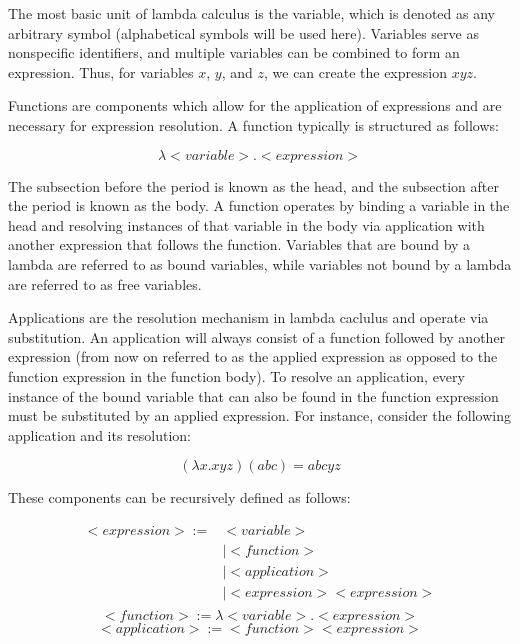 \documentclass[letterpaper, 10 pt, conference]{ieeeconf}  %
\begin{document}
The most basic unit of lambda calculus is the variable, which is denoted as any arbitrary symbol (alphabetical symbols will be used here). Variables serve as nonspecific identifiers, and multiple variables can be combined to form an expression. Thus, for variables $x$, $y$, and $z$, we can create the expression $xyz$.

Functions are components which allow for the application of expressions and are necessary for expression resolution. A function typically is structured as follows:

\begin{equation}
    \lambda <variable> . <expression>
\end{equation}

The subsection before the period is known as the head, and the subsection after the period is known as the body. A function operates by binding a variable in the head and resolving instances of that variable in the body via application with another expression that follows the function. Variables that are bound by a lambda are referred to as bound variables, while variables not bound by a lambda are referred to as free variables.

Applications are the resolution mechanism in lambda caclulus and operate via substitution. An application will always consist of a function followed by another expression (from now on referred to as the applied expression as opposed to the function expression in the function body). To resolve an application, every instance of the bound variable that can also be found in the function expression must be substituted by an applied expression. For instance, consider the following application and its resolution:

\begin{equation}
    (\lambda x . xyz) (abc) = abcyz
\end{equation}

These components can be recursively defined \cite{Rojas} as follows:

\begin{equation}
    \begin{split}
    <expression> := &<variable>\\
                    &| <function>\\
                    &| <application>\\
                    &| <expression> <expression>\\
    \end{split}
\end{equation}
\begin{equation}
    <function> := \lambda <variable> . <expression>
\end{equation}
\begin{equation}
    <application> := <function> <expression>
\end{equation}
\end{document}
